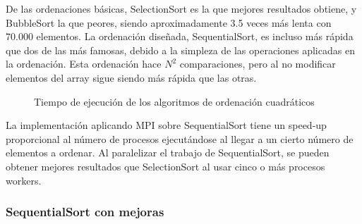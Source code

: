 			
		
		De las ordenaciones básicas, SelectionSort es la que mejores resultados obtiene, y BubbleSort la que peores, siendo aproximadamente 3.5 veces más lenta con 70.000 elementos. 
		La ordenación diseñada, SequentialSort, es incluso más rápida que dos de las más famosas, debido a la simpleza de las operaciones aplicadas en la ordenación. Esta ordenación hace \(N^{2}\) comparaciones, pero al no modificar elementos del array sigue siendo más rápida que las otras.
		
		\newpage
		
		\begin{figure}[!h]
			\centering
			\caption{Tiempo de ejecución de los algoritmos de ordenación cuadráticos}
		\end{figure}
		
		La implementación aplicando MPI sobre SequentialSort tiene un speed-up proporcional al número de procesos ejecutándose al llegar a un cierto número de elementos a ordenar.  %
		Al paralelizar el trabajo de SequentialSort, se pueden obtener mejores resultados que SelectionSort al usar cinco o más procesos workers.
		
		\subsubsection{SequentialSort con mejoras}
		
